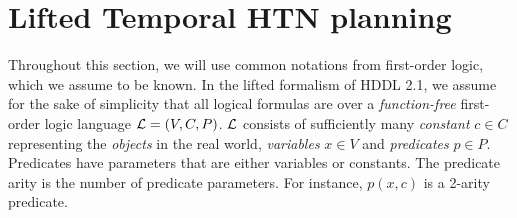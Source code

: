 \documentclass[letterpaper]{article} %
\begin{document}





\section{Lifted Temporal HTN planning}


Throughout this section, we will use common notations from first-order logic, which we assume to be known. In the lifted formalism of HDDL 2.1, we assume for the sake of simplicity that all logical formulas are over a {\it function-free} first-order logic language ${\cal{L}} = (V, C, P)$. ${\cal{L}}$ consists of sufficiently many {\it constant} $c \in C$ representing the {\it objects} in the real world, {\it variables} $x \in V$ and {\it predicates} $p \in P$. Predicates have parameters that are either variables or constants. The predicate arity is the number of predicate parameters. For instance, $p(x, c)$ is a 2-arity predicate.
\end{document}
